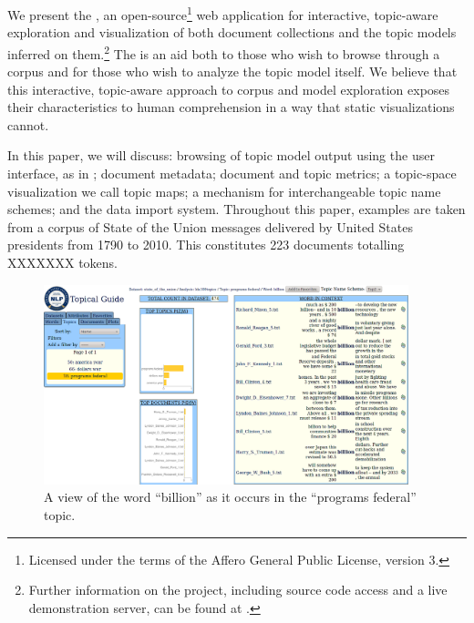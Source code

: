 \documentclass[11pt]{article}
\begin{document}
We present the \tool, an open-source\footnote{Licensed under the terms of the Affero
General Public License, version 3.} web application for interactive,
topic-aware exploration and visualization of both document collections and the
topic models inferred on them.\footnote{Further information on the project, including
source code access and a live demonstration server, can be found
at \texttt{\projecturl}.} The \tool{} is an aid both to those who wish to
browse through a corpus and for those who wish to analyze the topic model itself.
We believe that this interactive, topic-aware approach to corpus and model exploration
exposes their characteristics to human comprehension in a way that static visualizations cannot.

In this paper, we will discuss: browsing of topic model output using the \tool{} user interface, as in \cite{gardner_browser_2010};
document metadata; document and topic metrics; a topic-space visualization we call
topic maps; a mechanism for interchangeable topic name schemes; and the data import%
system. Throughout this paper, examples are taken from a
corpus of State of the Union messages delivered by United States presidents
from 1790 to 2010. This constitutes 223 documents totalling XXXXXXX tokens. %

\begin{figure}[t]
 \centering
 \includegraphics[width=400px,keepaspectratio=true]{./topic_word_view.png}
 \caption{A view of the word ``billion'' as it occurs in the ``programs federal'' topic.}
 \label{fig:topic_word}
\end{figure}
\end{document}
